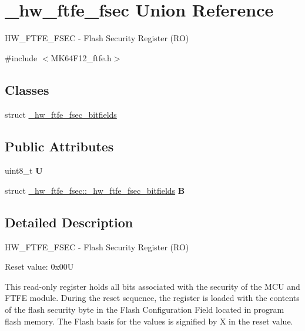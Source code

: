 \hypertarget{union__hw__ftfe__fsec}{}\section{\+\_\+hw\+\_\+ftfe\+\_\+fsec Union Reference}
\label{union__hw__ftfe__fsec}


H\+W\+\_\+\+F\+T\+F\+E\+\_\+\+F\+S\+EC -\/ Flash Security Register (RO)  




{\ttfamily \#include $<$M\+K64\+F12\+\_\+ftfe.\+h$>$}

\subsection*{Classes}
\begin{DoxyCompactItemize}
\item 
struct \hyperlink{struct__hw__ftfe__fsec_1_1__hw__ftfe__fsec__bitfields}{\+\_\+hw\+\_\+ftfe\+\_\+fsec\+\_\+bitfields}
\end{DoxyCompactItemize}
\subsection*{Public Attributes}
\begin{DoxyCompactItemize}
\item 
uint8\+\_\+t {\bfseries U}\hypertarget{union__hw__ftfe__fsec_a9861566124715120a40c449af26aaffe}{}\label{union__hw__ftfe__fsec_a9861566124715120a40c449af26aaffe}

\item 
struct \hyperlink{struct__hw__ftfe__fsec_1_1__hw__ftfe__fsec__bitfields}{\+\_\+hw\+\_\+ftfe\+\_\+fsec\+::\+\_\+hw\+\_\+ftfe\+\_\+fsec\+\_\+bitfields} {\bfseries B}\hypertarget{union__hw__ftfe__fsec_a08d24237747696c09ce4a6bd5298b925}{}\label{union__hw__ftfe__fsec_a08d24237747696c09ce4a6bd5298b925}

\end{DoxyCompactItemize}


\subsection{Detailed Description}
H\+W\+\_\+\+F\+T\+F\+E\+\_\+\+F\+S\+EC -\/ Flash Security Register (RO) 

Reset value\+: 0x00U

This read-\/only register holds all bits associated with the security of the M\+CU and F\+T\+FE module. During the reset sequence, the register is loaded with the contents of the flash security byte in the Flash Configuration Field located in program flash memory. The Flash basis for the values is signified by X in the reset value. 

